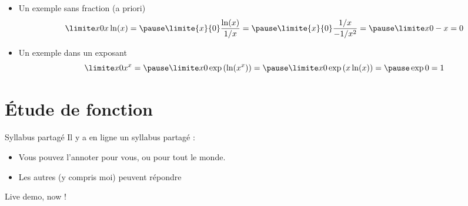 \begin{frame}%
  \begin{example}
    \begin{itemize}
    \item Un exemple sans fraction (a priori)
      \begin{equation*}
        \limite x 0 x\ln(x) = \pause \limite{x}{0} \frac{\ln(x)}{1/x} = \pause \limite{x}{0} \frac{1/x}{-1/x^{2}} = \pause \limite x 0 -x = 0
      \end{equation*}
    \item Un exemple dans un exposant
      \begin{equation*}
        \limite x 0 x^{x}
        =\pause \limite x 0 \exp{(\ln(x^{x}))}
        =\pause \limite x 0 \exp{(x\ln(x))}
        =\pause \exp{0} = 1
      \end{equation*}
    \end{itemize}
  \end{example}
\end{frame}
\section{Étude de fonction}
\begin{frame}{Syllabus partagé}
  Il y a en ligne un \og syllabus partagé\fg{} :
  \begin{itemize}[<+->]
  \item Vous pouvez l'annoter pour vous,\pause{} ou pour tout le monde.
  \item Les autres (y compris moi) peuvent répondre
  \end{itemize}\pause
  
  Live demo, now !
\end{frame}
